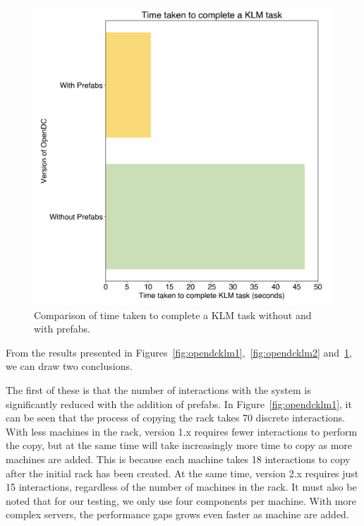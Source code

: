 \documentclass[11pt]{article}
\begin{document}
			\begin{figure}[]
				\centering
				\includegraphics[width=\textwidth]{results/klmbarcharts.png}
				\caption[Time taken to complete a KLM task in two variants of \opendc{}]{Comparison of time taken to complete a KLM task without and with prefabs.}
				\label{fig:opendcbarchart}
			\end{figure}

			From the results presented in Figures~\ref{fig:opendcklm1},~\ref{fig:opendcklm2} and~\ref{fig:opendcbarchart}, we can draw two conclusions.

			The first of these is that the number of interactions with the system is significantly reduced with the addition of prefabs.
			In Figure~\ref{fig:opendcklm1}, it can be seen that the process of copying the rack takes 70 discrete interactions.
			With less machines in the rack, version 1.x requires fewer interactions to perform the copy, but at the same time will take increasingly more time to copy as more machines are added.
			This is because each machine takes 18 interactions to copy after the initial rack has been created.
			At the same time, version 2.x requires just 15 interactions, regardless of the number of machines in the rack.
			It must also be noted that for our testing, we only use four components per machine.
			With more complex servers, the performance gaps grows even faster as machine are added.
\end{document}
